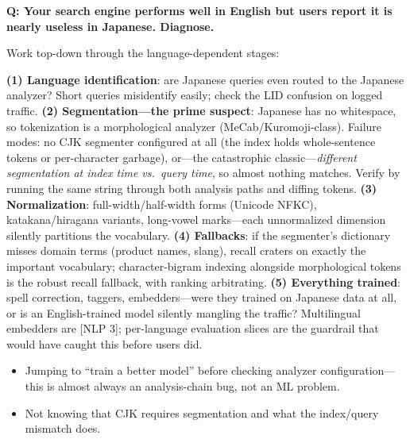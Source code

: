 \begin{interviewq}

\end{interviewq}


\begin{interviewq}
\textbf{Q: Your search engine performs well in English but users report it is nearly useless in Japanese. Diagnose.}

 \quad {} \quad \badgefreq{\freqlow}

\stronganswer

Work top-down through the language-dependent stages:

\textbf{(1) Language identification}: are Japanese queries even routed to the Japanese analyzer? Short queries misidentify easily; check the LID confusion on logged traffic.
\textbf{(2) Segmentation---the prime suspect}: Japanese has no whitespace, so tokenization is a morphological analyzer (MeCab/Kuromoji-class). Failure modes: no CJK segmenter configured at all (the index holds whole-sentence tokens or per-character garbage), or---the catastrophic classic---\textit{different segmentation at index time vs.\ query time}, so almost nothing matches. Verify by running the same string through both analysis paths and diffing tokens.
\textbf{(3) Normalization}: full-width/half-width forms (Unicode NFKC), katakana/hiragana variants, long-vowel marks---each unnormalized dimension silently partitions the vocabulary.
\textbf{(4) Fallbacks}: if the segmenter's dictionary misses domain terms (product names, slang), recall craters on exactly the important vocabulary; character-bigram indexing alongside morphological tokens is the robust recall fallback, with ranking arbitrating.
\textbf{(5) Everything trained}: spell correction, taggers, embedders---were they trained on Japanese data at all, or is an English-trained model silently mangling the traffic? Multilingual embedders are [NLP 3]; per-language evaluation slices are the guardrail that would have caught this before users did.

\redflags
\begin{itemize}
    \item Jumping to ``train a better model'' before checking analyzer configuration---this is almost always an analysis-chain bug, not an ML problem.
    \item Not knowing that CJK requires segmentation and what the index/query mismatch does.
\end{itemize}


\end{interviewq}
